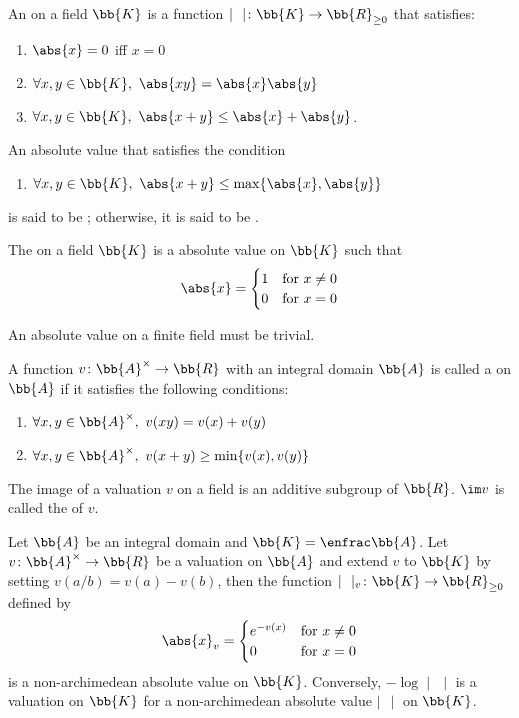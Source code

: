 \cite{gouvea}
An  on a field $\bb{K}$ is a function $\mid \ \ \mid \colon \bb{K} \to \bb{R}_{\ge0}$ that satisfies:
\begin{enumerate}
\item $\abs{x} = 0$ iff $x = 0$
\item $\forall x, y \in \bb{K},\ \abs{xy} = \abs{x}\abs{y}$
\item $\forall x, y \in \bb{K},\ \abs{x+y} \le \abs{x}+\abs{y}$.
\end{enumerate}

An absolute value that satisfies the condition
\begin{enumerate}[resume*]
\item $\forall x, y \in \bb{K},\ \abs{x+y} \le \max \{ \abs{x},\abs{y} \}$
\end{enumerate}
is said to be ; otherwise, it is said to be .

The  on a field $\bb{K}$ is a absolute value on $\bb{K}$ such that
\[
\abs{x} = \begin{cases}
 1 & \text{for}\ x \neq 0 \\
 0 & \text{for}\ x = 0
 \end{cases}
\]

An absolute value on a finite field must be trivial.

A function $v \colon \bb{A}^\times \to \bb{R}$ with an integral domain $\bb{A}$ is called a  on $\bb{A}$ if it satisfies the following conditions:
\begin{enumerate}
\item $\forall x, y \in \bb{A}^\times,\ v(xy) = v(x) + v(y)$
\item $\forall x, y \in \bb{A}^\times,\ v(x+y) \ge \min \{ v(x), v(y) \}$
\end{enumerate}

The image of a valuation $v$ on a field is an additive subgroup of $\bb{R}$. $\im v$ is called the  of $v$.

Let $\bb{A}$ be an integral domain and $\bb{K} = \enfrac\bb{A}$. Let $v\colon \bb{A}^\times \to \bb{R}$ be a valuation on $\bb{A}$ and extend $v$ to $\bb{K}$ by setting $v(a/b) = v(a) - v(b)$, then the function $\mid\ \ \mid_v \colon \bb{K} \to \bb{R}_{\ge 0}$ defined by
\[
\abs{x}_v = \begin{cases}
 e^{-v(x)} & \text{for}\ x \neq 0 \\
 0 & \text{for}\ x = 0
 \end{cases}
 \] is a non-archimedean absolute value on $\bb{K}$. Conversely, $-\log \mid \,\ \mid$ is a valuation on $\bb{K}$ for a non-archimedean absolute value $\mid\ \ \mid$ on $\bb{K}$.


